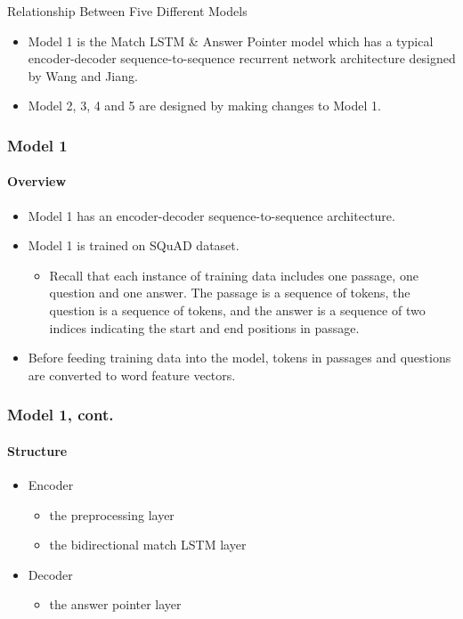 \documentclass{beamer}
\begin{document}
\begin{frame}{Relationship Between Five Different Models}
    \begin{itemize}
        \item Model 1 is the Match LSTM \& Answer Pointer model which has a typical encoder-decoder sequence-to-sequence recurrent network architecture designed by Wang and Jiang.
        \item Model 2, 3, 4 and 5 are designed by making changes to Model 1.
    \end{itemize}
\end{frame}

\begin{frame} \frametitle{Model 1}\framesubtitle{Overview}
  \begin{itemize}
      \item Model 1 has an encoder-decoder sequence-to-sequence architecture.
      \item Model 1 is trained on SQuAD dataset.
            \begin{itemize}
                \item Recall that each instance of training data includes one passage, one question and one answer. The passage is a sequence of tokens, the question is a sequence of tokens, and the answer is a sequence of two indices indicating the start and end positions in passage.
            \end{itemize}
      \item Before feeding training data into the model, tokens in passages and questions are converted to word feature vectors.
  \end{itemize}
\end{frame}

\begin{frame} \frametitle{Model 1, cont.}\framesubtitle{Structure}
    \begin{itemize}
        \item Encoder
            \begin{itemize}
                \item the preprocessing layer
                \item the bidirectional match LSTM layer
            \end{itemize}
        \item Decoder
            \begin{itemize}
                \item the answer pointer layer
            \end{itemize}
    \end{itemize}

\end{frame}
\end{document}
